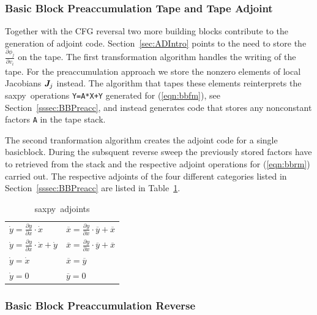 \documentclass[acmtocl,acmnow]{acmtrans2m}
\newcommand{\basicblock}{basicblock}
\newcommand{\saxpy}{saxpy}
\newcommand{\bmJ}{\mbox{\bf\em J}}
\newcommand{\code}[1]{{\small\tt{#1}}}
\newcommand{\refeqn}[1]{(\ref{#1})}
\newcommand{\refsec}[1]{Section~\ref{#1}}
\newcommand{\reftab}[1]{Table~\ref{#1}}
\begin{document}
\subsubsection{Basic Block Preaccumulation Tape and Tape Adjoint}\label{sssec:bbTA}

Together with the CFG reversal two more building blocks contribute to the 
generation of adjoint code. 
\refsec{sec:ADIntro} points to the need to store the $\frac{\partial \phi_j}{\partial v_i}$ on the tape. 
The first transformation algorithm handles the writing of the tape.
For the preaccumulation approach we store the nonzero elements of local
Jacobians $\bmJ_j$ instead. The algorithm that tapes these elements reinterprets
the \saxpy\ operations \code{Y=A*X+Y} generated for \refeqn{eqn:bbfm}, see \refsec{sssec:BBPreacc}, 
and instead generates code that stores any nonconstant factors \code{A} in the tape stack. 

The second tranformation algorithm creates the adjoint code for a single \basicblock.
During the subsquent reverse sweep the previously stored factors have to retrieved from the stack and 
the respective adjoint operations for \refeqn{eqn:bbrm} carried out. 
The respective adjoints of the four different categories listed in \refsec{sssec:BBPreacc} are listed in 
\reftab{tab:saxpyAdj}.
\begin{table}
\begin{tabular}{|l|l|}\hline
 $\dot{y} = \frac{\partial y }{\partial x }\cdot \dot{x}$ &  $\overline{x} = \frac{\partial y }{\partial x }\cdot \overline{y} + \overline{x}$ \\
 $\dot{y} = \frac{\partial y }{\partial x }\cdot \dot{x} + \dot{y}$ & $\overline{x} = \frac{\partial y }{\partial x }\cdot \overline{y} + \overline{x}$ \\
 $\dot{y} = \dot{x}$ 					& $\overline{x} = \overline{y}$ \\
 $\dot{y} = 0$ 						& $\overline{y} = 0$ 
\end{tabular}
\caption{\saxpy\ adjoints} \label{tab:saxpyAdj}
\end{table} 
      


\subsubsection{Basic Block Preaccumulation Reverse}\label{sssec:BBRev}
\end{document}
